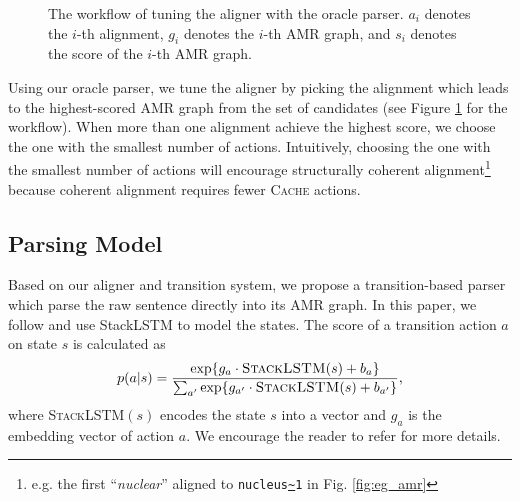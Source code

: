 \documentclass[11pt,a4paper]{article}
\begin{document}
\begin{figure}[t]
	\centering
	\small
	\caption{The workflow of tuning the aligner with the oracle parser.
	$a_i$ denotes the $i$-th alignment,
	$g_i$ denotes the $i$-th AMR graph, and 
	$s_i$ denotes the score of the $i$-th AMR graph.}\label{fig:workflow}
\end{figure}
Using our oracle parser, we tune the aligner by picking the alignment 
which leads to the highest-scored AMR graph from the set of candidates
(see Figure \ref{fig:workflow} for the workflow).
When more than one alignment achieve the highest score, we choose the one
with the smallest number of actions.
Intuitively, choosing the one with the smallest number of actions will
encourage structurally coherent alignment\footnote{e.g. the first ``\textit{nuclear}'' aligned to \texttt{nucleus\url{~}1} in Fig. \ref{fig:eg_amr}}
because coherent alignment requires fewer \textsc{Cache} actions.

\subsection{Parsing Model}\label{sec:parser}
Based on our aligner and transition system, we propose a transition-based parser
which parse the raw sentence directly into its AMR graph.
In this paper, we follow \citet{ballesteros-alonaizan:2017:EMNLP2017}
and use StackLSTM \cite{dyer-EtAl:2015:ACL-IJCNLP} to model the states.
The score of a transition action $a$ on state $s$ is calculated as
\[
p(a|s)=\frac{\exp\{g_a\cdot \textsc{StackLSTM}(s) + b_a\}}{\sum_{a'}\exp\{g_{a'}\cdot \textsc{StackLSTM}(s) + b_{a'}\}}\text{,}
\]
where \textsc{StackLSTM}$(s)$ encodes the state $s$ into a vector
and $g_a$ is the embedding vector of action $a$.
We encourage the reader to refer \citet{ballesteros-alonaizan:2017:EMNLP2017}
for more details.
\end{document}
